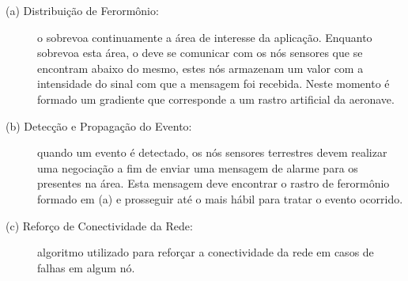 \begin{description}

	\item[ (a) Distribuição de Ferormônio: ] o \vant sobrevoa continuamente
a área de interesse da aplicação. Enquanto sobrevoa esta área, o \vant deve se
comunicar com os nós sensores que se encontram abaixo do mesmo, estes nós
armazenam um valor com a intensidade do sinal com que a mensagem foi recebida.
Neste momento é formado um gradiente que corresponde a um rastro artificial da aeronave.

	\item[ (b) Detecção e Propagação do Evento:] quando um evento é
detectado, os nós sensores terrestres devem realizar uma negociação a fim de
enviar uma mensagem de alarme para os \vants presentes na área. Esta mensagem
deve encontrar o rastro de ferormônio formado em (a) e prosseguir até o \vant
mais hábil para tratar o evento ocorrido.

	\item[ (c) Reforço de Conectividade da Rede:] algoritmo utilizado para reforçar a conectividade da rede em casos de falhas em algum nó.




\end{description}

